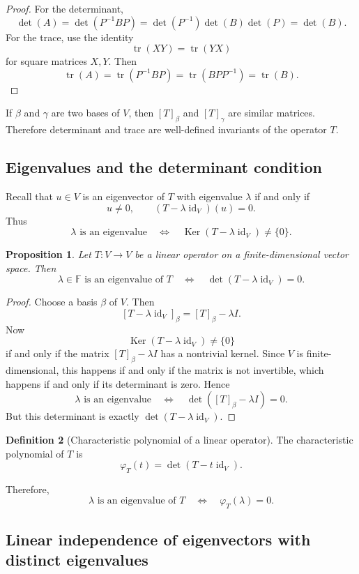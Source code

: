 \documentclass[11pt]{article}
\newcommand{\F}{\mathbb F}
\newcommand{\id}{\operatorname{id}}
\newcommand{\tr}{\operatorname{tr}}
\newcommand{\Ker}{\operatorname{Ker}}
\theoremstyle{definition}
\newtheorem{definition}{Definition}[section]
\theoremstyle{plain}
\newtheorem{proposition}[definition]{Proposition}
\begin{document}
\begin{proof}
For the determinant,
\[
\det(A)=\det(P^{-1}BP)
=\det(P^{-1})\det(B)\det(P)
=\det(B).
\]
For the trace, use the identity
\[
\tr(XY)=\tr(YX)
\]
for square matrices $X,Y$.  Then
\[
\tr(A)=\tr(P^{-1}BP)
=\tr(BPP^{-1})
=\tr(B).
\]
\end{proof}

If $\beta$ and $\gamma$ are two bases of $V$, then $[T]_{\beta}$ and $[T]_{\gamma}$ are similar matrices.  Therefore determinant and trace are well-defined invariants of the operator $T$.

\subsection{Eigenvalues and the determinant condition}

Recall that $u\in V$ is an eigenvector of $T$ with eigenvalue $\lambda$ if and only if
\[
u\neq 0,
\qquad
(T-\lambda\id_V)(u)=0.
\]
Thus
\[
\lambda\text{ is an eigenvalue}
\quad\Longleftrightarrow\quad
\Ker(T-\lambda\id_V)\neq\{0\}.
\]

\begin{proposition}
Let $T:V\to V$ be a linear operator on a finite-dimensional vector space.  Then
\[
\lambda\in\F\text{ is an eigenvalue of }T
\quad\Longleftrightarrow\quad
\det(T-\lambda\id_V)=0.
\]
\end{proposition}

\begin{proof}
Choose a basis $\beta$ of $V$.  Then
\[
[T-\lambda\id_V]_{\beta}=[T]_{\beta}-\lambda I.
\]
Now
\[
\Ker(T-\lambda\id_V)\neq\{0\}
\]
if and only if the matrix $[T]_{\beta}-\lambda I$ has a nontrivial kernel.  Since $V$ is finite-dimensional, this happens if and only if the matrix is not invertible, which happens if and only if its determinant is zero.  Hence
\[
\lambda\text{ is an eigenvalue}
\quad\Longleftrightarrow\quad
\det([T]_{\beta}-\lambda I)=0.
\]
But this determinant is exactly $\det(T-\lambda\id_V)$.
\end{proof}

\begin{definition}[Characteristic polynomial of a linear operator]
The characteristic polynomial of $T$ is
\[
\varphi_T(t)=\det(T-t\id_V).
\]
\end{definition}

Therefore,
\[
\lambda\text{ is an eigenvalue of }T
\quad\Longleftrightarrow\quad
\varphi_T(\lambda)=0.
\]

\subsection{Linear independence of eigenvectors with distinct eigenvalues}
\end{document}
